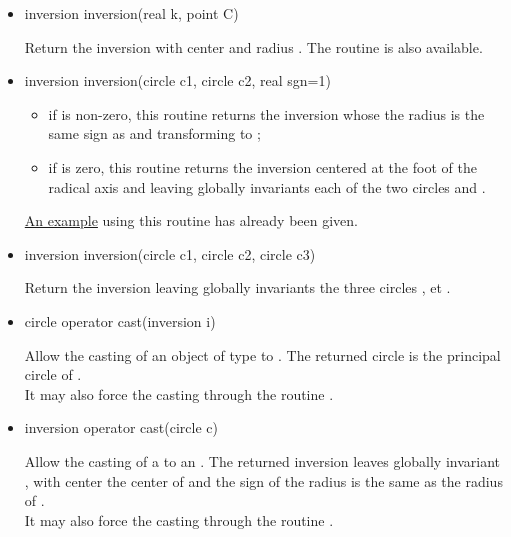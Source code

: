 \documentclass[pdftex]{article}
\begin{document}
\begin{itemize}
\item {}
  \begin{Vcolor}
    inversion inversion(real k, point C)
  \end{Vcolor}
  Return the inversion with center  and radius . The
  routine  is also available.
\item {}
  \begin{Vcolor}
    inversion inversion(circle c1, circle c2, real sgn=1)
  \end{Vcolor}
  \begin{itemize}
  \item if  is non-zero, this routine returns the inversion
    whose the radius is the same sign as  and transforming
     to ;
  \item if  is zero, this routine returns the inversion
    centered at the foot of the radical axis and leaving globally
    invariants each of the two circles  and .
  \end{itemize}
  \href{#exemple_inversion}{An example} using this routine has already been given.
\item {}
  \begin{Vcolor}
    inversion inversion(circle c1, circle c2, circle c3)
  \end{Vcolor}
  Return the inversion leaving globally invariants the three circles
  ,  et .
\item {}
  \begin{Vcolor}
    circle operator cast(inversion i)
  \end{Vcolor}
  Allow the casting of an object of type  to
  . The returned circle is the principal circle
  of .\\
  It may also force the casting through the routine
  .
\item {}
  \begin{Vcolor}
    inversion operator cast(circle c)
  \end{Vcolor}
  Allow the casting of a  to an .
  The returned inversion leaves globally invariant , with
  center the center of  and the sign of the radius is the
  same as the radius of .\\
  It may also force the casting through the routine
  .

\end{itemize}
\end{document}
